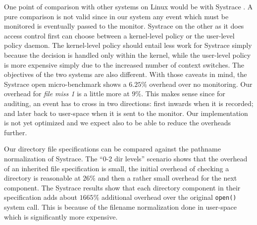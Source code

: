 One point of comparison with other systems on Linux would be with
Systrace \cite{systrace}. 
A pure comparison is not valid since in our system any event
which must be monitored is eventually passed to the monitor.
Systrace on the other as it does access control first can choose between a
kernel-level policy or the user-level policy daemon. 
The kernel-level policy should entail less work for Systrace
simply because the decision is handled only within the kernel, while
the user-level policy is more expensive simply due to the increased
number of context switches.
The objectives of the two systems are also different.
With those caveats in mind, the Systrace open micro-benchmark shows a
$6.25\%$ overhead over no monitoring.
Our overhead for {\em file miss 1} is a little more at $9\%$.
This makes sense since for auditing,
an event has to cross in two directions: first inwards when it is recorded; 
and later back to user-space when it is sent to the monitor.
Our implementation is not yet optimized and we expect also to be
able to reduce the overheads further.

Our directory file specifications can be compared against the 
pathname normalization of Systrace.
The ``0-2 dir levels'' scenario shows that the overhead of an inherited
file specification is small, the initial overhead of checking a directory is
reasonable at $26\%$ and then a rather small overhead for the next component.
The Systrace results show that each directory
component in their specification adds about $1665\%$ additional overhead
over the original {\tt open()} system call.
This is because of the filename normalization done in user-space which
is significantly more expensive.

